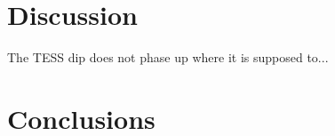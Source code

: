 \documentclass[12pt,twocolumn,tighten]{aastex62}
\begin{document}
\section{Discussion}
\label{sec:discussion}

The TESS dip does not phase up where it is supposed to...
\label{fig:o_minus_c}

\section{Conclusions}
\label{sec:conclusions}




%
%
%
\end{document}
